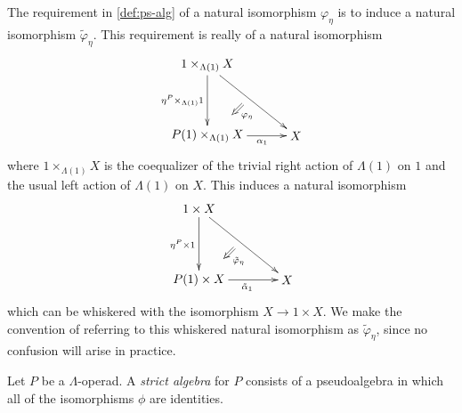 \begin{rem}
  The requirement in \cref{def:ps-alg} of a natural isomorphism $\varphi_\eta$ is to induce a natural isomorphism $\tilde{\varphi}_\eta$. This requirement is really of a natural isomorphism
    \[
      \xy
        (0,0)*+{1 \times_{\Lambda(1)} X}="a";
        (0,-20)*+{P(1) \times_{\Lambda(1)} X}="b";
        (25,-20)*+{X}="c";
        {\ar_{\eta^P \times_{\Lambda(1)} 1} "a" ; "b"};
        {\ar_<<<<<{\alpha_1} "b" ; "c"};
        {\ar "a" ; "c"};
        {\ar@{=>}^{\varphi_\eta} (10,-11) ; (7,-14)};
      \endxy
    \]
  where $1 \times_{\Lambda(1)} X$ is the coequalizer of the trivial right action of $\Lambda(1)$ on $1$ and the usual left action of $\Lambda(1)$ on $X$. This induces a natural isomorphism
    \[
      \xy
        (0,0)*+{1 \times X}="a";
        (0,-20)*+{P(1) \times X}="b";
        (25,-20)*+{X}="c";
        {\ar_{\eta^P \times 1} "a" ; "b"};
        {\ar_<<<<<<{\tilde{\alpha}_1} "b" ; "c"};
        {\ar "a" ; "c"};
        {\ar@{=>}^{\tilde{\varphi}_\eta} (10,-11) ; (7,-14)};
      \endxy
    \]
  which can be whiskered with the isomorphism $X \rightarrow 1 \times X$. We make the convention of referring to this whiskered natural isomorphism as $\tilde{\varphi}_\eta$, since no confusion will arise in practice.
\end{rem}

\begin{Defi}\label{Defi:strictalgebra-lop}
Let $P$ be a $\Lambda$-operad. A \textit{strict algebra} for $P$ consists of a pseudoalgebra in which all of the isomorphisms $\phi$ are identities.
\end{Defi}

